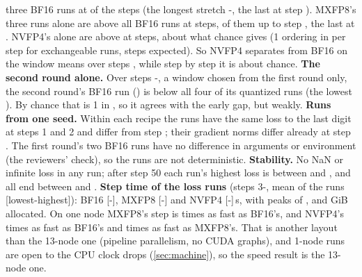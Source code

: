 three BF16 runs at \TriQwFpFourSepSteps{} of the \TriQwFpFourLSteps{} steps (the longest stretch \TriQwFpFourSepRunFrom-\TriQwFpFourSepRunTo, the last at step \TriQwFpFourSepLast). MXFP8's three runs alone are above all BF16 runs at \TriQwFpFourSepMxSteps{} steps, \TriQwFpFourSepMxIn{} of them up to step \TriQwFpFourCut, the last at \TriQwFpFourSepMxLast. NVFP4's alone are above at \TriQwFpFourSepNvSteps{} steps, about what chance gives (1 ordering in \TriQwFpFourOddsOne{} per step for exchangeable runs, \TriQwFpFourSepNvChance{} steps expected). So NVFP4 separates from BF16 on the window means over steps \TriQwFpFourSepWinBoth, while step by step it is about chance. \textbf{The second round alone.} Over steps \TriQwFpFourWinEarlyFrom-\TriQwFpFourWinEarlyTo, a window chosen from the first round only, the second round's BF16 run (\TriQwFpFourNewBf) is below all four of its quantized runs (the lowest \TriQwFpFourNewQLo). By chance that is 1 in \TriQwFpFourNewOdds, so it agrees with the early gap, but weakly. \textbf{Runs from one seed.} Within each recipe the runs have the same loss to the last digit at steps 1 and 2 and differ from step \TriQwFpFourLossDiffFrom; their gradient norms differ already at step \TriQwFpFourGnDiffFrom. The first round's two BF16 runs have no difference in arguments or environment (the reviewers' check), so the runs are not deterministic. \textbf{Stability.} No NaN or infinite loss in any run; after step 50 each run's highest loss is between \TriQwFpFourLMaxLo{} and \TriQwFpFourLMaxHi, and all \TriQwFpFourLJobs{} end between \TriQwFpFourLEndLo{} and \TriQwFpFourLEndHi. \textbf{Step time of the loss runs} (steps 3-\TriQwFpFourLSteps, mean of the runs [lowest-highest]): BF16 \TriQwFpFourLStepBf{} [\TriQwFpFourLStepLoBf-\TriQwFpFourLStepHiBf], MXFP8 \TriQwFpFourLStepMx{} [\TriQwFpFourLStepLoMx-\TriQwFpFourLStepHiMx] and NVFP4 \TriQwFpFourLStepNv{} [\TriQwFpFourLStepLoNv-\TriQwFpFourLStepHiNv]\,s, with peaks of \TriQwFpFourLMemBf, \TriQwFpFourLMemMx{} and \TriQwFpFourLMemNv{} GiB allocated. On one node MXFP8's step is \TriQwFpFourLSpMxBf{} times as fast as BF16's, and NVFP4's \TriQwFpFourLSpNvBf{} times as fast as BF16's and \TriQwFpFourLSpNvMx{} times as fast as MXFP8's. That is another layout than the 13-node one (pipeline parallelism, no CUDA graphs), and 1-node runs are open to the CPU clock drops (\cref{sec:machine}), so the speed result is the 13-node one.

